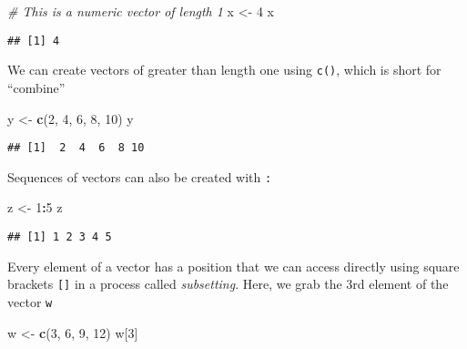 \documentclass[
]{article}
\newenvironment{Shaded}{\begin{snugshade}}{\end{snugshade}}
\newcommand{\CommentTok}[1]{\textcolor[rgb]{0.56,0.35,0.01}{\textit{#1}}}
\newcommand{\DecValTok}[1]{\textcolor[rgb]{0.00,0.00,0.81}{#1}}
\newcommand{\FunctionTok}[1]{\textcolor[rgb]{0.13,0.29,0.53}{\textbf{#1}}}
\newcommand{\NormalTok}[1]{#1}
\newcommand{\OtherTok}[1]{\textcolor[rgb]{0.56,0.35,0.01}{#1}}
\newcommand{\SpecialCharTok}[1]{\textcolor[rgb]{0.81,0.36,0.00}{\textbf{#1}}}
\begin{document}
\begin{Shaded}
\begin{Highlighting}[]
\CommentTok{\# This is a numeric vector of length 1}
\NormalTok{x }\OtherTok{\textless{}{-}} \DecValTok{4}
\NormalTok{x}
\end{Highlighting}
\end{Shaded}

\begin{verbatim}
## [1] 4
\end{verbatim}

We can create vectors of greater than length one using \texttt{c()},
which is short for ``combine''

\begin{Shaded}
\begin{Highlighting}[]
\NormalTok{y }\OtherTok{\textless{}{-}} \FunctionTok{c}\NormalTok{(}\DecValTok{2}\NormalTok{, }\DecValTok{4}\NormalTok{, }\DecValTok{6}\NormalTok{, }\DecValTok{8}\NormalTok{, }\DecValTok{10}\NormalTok{)}
\NormalTok{y}
\end{Highlighting}
\end{Shaded}

\begin{verbatim}
## [1]  2  4  6  8 10
\end{verbatim}

Sequences of vectors can also be created with \texttt{:}

\begin{Shaded}
\begin{Highlighting}[]
\NormalTok{z }\OtherTok{\textless{}{-}} \DecValTok{1}\SpecialCharTok{:}\DecValTok{5}
\NormalTok{z}
\end{Highlighting}
\end{Shaded}

\begin{verbatim}
## [1] 1 2 3 4 5
\end{verbatim}

Every element of a vector has a position that we can access directly
using square brackets \texttt{{[}{]}} in a process called
\emph{subsetting}. Here, we grab the 3rd element of the vector
\texttt{w}

\begin{Shaded}
\begin{Highlighting}[]
\NormalTok{w }\OtherTok{\textless{}{-}} \FunctionTok{c}\NormalTok{(}\DecValTok{3}\NormalTok{, }\DecValTok{6}\NormalTok{, }\DecValTok{9}\NormalTok{, }\DecValTok{12}\NormalTok{)}
\NormalTok{w[}\DecValTok{3}\NormalTok{]}
\end{Highlighting}
\end{Shaded}
\end{document}
